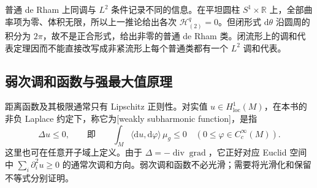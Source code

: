 \ProseParagraphBreak

普通 de Rham 上同调与 \(L^2\) 条件记录不同的信息。在平坦圆柱 \(S^1\times\mathbb R\) 上，全部曲率项为零、体积无限，所以上一推论给出各次 \(\mathcal H_{(2)}^q=0\)。但闭形式 \(\mathrm d\theta\) 沿圆周的积分为 \(2\pi\)，故不是正合形式，给出非零的普通 de Rham 类。闭流形上的调和代表定理因而不能直接改写成非紧流形上每个普通类都有一个 \(L^2\) 调和代表。

\subsection{弱次调和函数与强最大值原理}
\label{g3:subsec:1504:04}
距离函数及其极限通常只有 Lipschitz 正则性。对实值 \(u\in H^1_{\mathrm{loc}}(M)\)，在本书的非负 Laplace 约定下，称它为[weakly subharmonic function]，是指
\begin{equation}\label{g3:eq:weak-subharmonic-convention}
	\Delta u\le0,
	\qquad\text{即}\qquad
	\int_M\langle\mathrm du,\mathrm d\varphi\rangle\,\mu_g\le0
	\quad(0\le\varphi\in C_c^\infty(M)).
\end{equation}
这里也可在任意开子域上定义。由于 \(\Delta=-\operatorname{div}\operatorname{grad}\)，它正好对应 Euclid 空间中 \(\sum_i\partial_i^2u\ge0\) 的通常次调和方向。弱次调和函数不必光滑；需要将光滑化和保留不等式分别证明。

